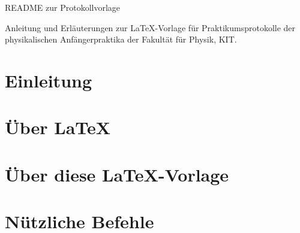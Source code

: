 \documentclass{include/protokollclass}
\begin{document}
	\FrontMatter
	
	\begin{titlepage}
		\centering\Huge
		
		\vphantom{}
		
		\vspace{100px}
		
		README zur Protokollvorlage
		
		\vspace{50px}
		
		\large Anleitung und Erläuterungen zur LaTeX-Vorlage für Praktikumsprotokolle der physikalischen Anfängerpraktika der Fakultät für Physik, KIT.
	\end{titlepage}

	\tableofcontents
	
	
	
	\MainMatter
	
	\chapter{Einleitung}
	
	\chapter{Über LaTeX}
	
	\chapter{Über diese LaTeX-Vorlage}
	
	\chapter{Nützliche Befehle}
	
	
	
	
	
	\TheBibliography
	
	
	
	
\end{document}
